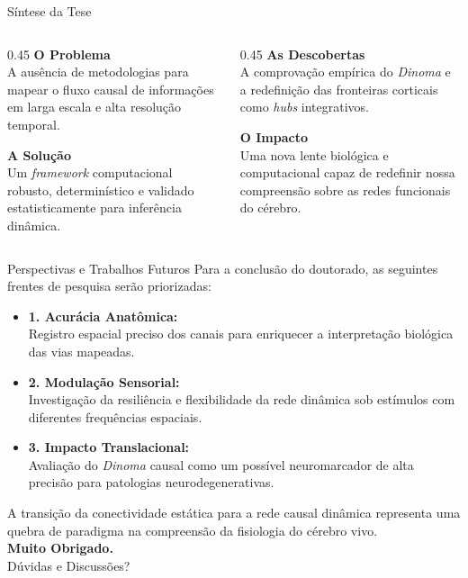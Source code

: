 \documentclass[10pt]{beamer}
\begin{document}
\begin{frame}{Síntese da Tese}
    \centering
    \vspace{0.5cm}
    
    \begin{columns}[T]
        \begin{column}{0.45\textwidth}
            \textbf{O Problema} \\
            \small A ausência de metodologias para mapear o fluxo causal de informações em larga escala e alta resolução temporal.
            
            \vspace{0.5cm}
            \textbf{A Solução} \\
            \small Um \textit{framework} computacional robusto, determinístico e validado estatisticamente para inferência dinâmica.
        \end{column}
        
        \begin{column}{0.45\textwidth}
            \textbf{As Descobertas} \\
            \small A comprovação empírica do \textit{Dinoma} e a redefinição das fronteiras corticais como \textit{hubs} integrativos.
            
            \vspace{0.5cm}
            \textbf{O Impacto} \\
            \small Uma nova lente biológica e computacional capaz de redefinir nossa compreensão sobre as redes funcionais do cérebro.
        \end{column}
    \end{columns}
\end{frame}

\begin{frame}{Perspectivas e Trabalhos Futuros}
    \justifying
    \vspace{0.3cm}
    Para a conclusão do doutorado, as seguintes frentes de pesquisa serão priorizadas:
    
    \vspace{0.6cm}
    \begin{itemize}
        \setlength\itemsep{0.5cm}
        \item \textbf{1. Acurácia Anatômica:}\\
        Registro espacial preciso dos canais para enriquecer a interpretação biológica das vias mapeadas.
        \item \textbf{2. Modulação Sensorial:}\\
        Investigação da resiliência e flexibilidade da rede dinâmica sob estímulos com diferentes frequências espaciais.
        \item \textbf{3. Impacto Translacional:}\\
        Avaliação do \textit{Dinoma} causal como um possível neuromarcador de alta precisão para patologias neurodegenerativas.
    \end{itemize}
\end{frame}

\begin{frame}[standout]
    A transição da conectividade estática para a rede causal dinâmica representa uma quebra de paradigma na compreensão da fisiologia do cérebro vivo.\\
    \vspace{1.2cm}
    \textbf{Muito Obrigado.}\\
    \vspace{0.8cm}
    \normalsize Dúvidas e Discussões?
\end{frame}
\end{document}

